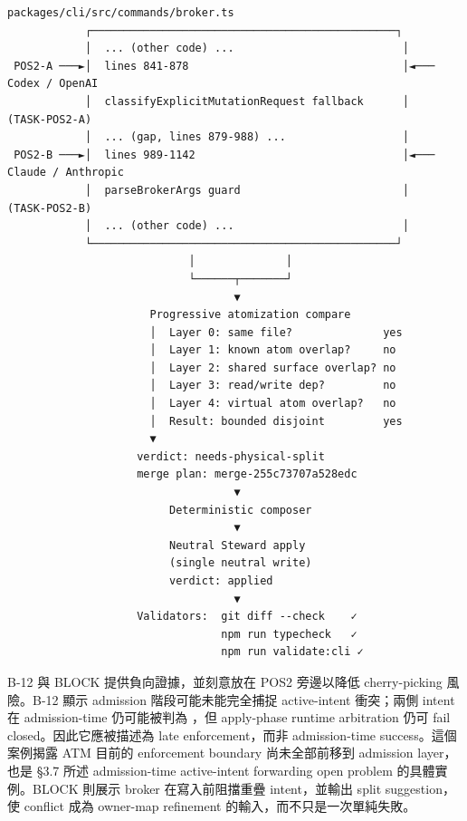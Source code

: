 \documentclass[a4paper,fontset=none]{ctexart}
\begin{document}
\begin{Verbatim}[breaklines=true,fontsize=\footnotesize]
              packages/cli/src/commands/broker.ts
            ┌───────────────────────────────────────────────┐
            │  ... (other code) ...                          │
 POS2-A ───►│  lines 841-878                                 │◄─── Codex / OpenAI
            │  classifyExplicitMutationRequest fallback      │     (TASK-POS2-A)
            │  ... (gap, lines 879-988) ...                  │
 POS2-B ───►│  lines 989-1142                                │◄─── Claude / Anthropic
            │  parseBrokerArgs guard                         │     (TASK-POS2-B)
            │  ... (other code) ...                          │
            └───────────────────────────────────────────────┘
                            │              │
                            └──────┬───────┘
                                   ▼
                      Progressive atomization compare
                      │  Layer 0: same file?              yes
                      │  Layer 1: known atom overlap?     no
                      │  Layer 2: shared surface overlap? no
                      │  Layer 3: read/write dep?         no
                      │  Layer 4: virtual atom overlap?   no
                      │  Result: bounded disjoint         yes
                      ▼
                    verdict: needs-physical-split
                    merge plan: merge-255c73707a528edc
                                   ▼
                         Deterministic composer
                                   ▼
                         Neutral Steward apply
                         (single neutral write)
                         verdict: applied
                                   ▼
                    Validators:  git diff --check    ✓
                                 npm run typecheck   ✓
                                 npm run validate:cli ✓
\end{Verbatim}

B-12 與 BLOCK 提供負向證據，並刻意放在 POS2 旁邊以降低 cherry-picking 風險。B-12 顯示 admission 階段可能未能完全捕捉 active-intent 衝突；兩側 intent 在 admission-time 仍可能被判為 \texttt{}，但 apply-phase runtime arbitration 仍可 fail closed。因此它應被描述為 late enforcement，而非 admission-time success。這個案例揭露 ATM 目前的 enforcement boundary 尚未全部前移到 admission layer，也是 §3.7 所述 admission-time active-intent forwarding open problem 的具體實例。BLOCK 則展示 broker 在寫入前阻擋重疊 intent，並輸出 split suggestion，使 conflict 成為 owner-map refinement 的輸入，而不只是一次單純失敗。
\end{document}

